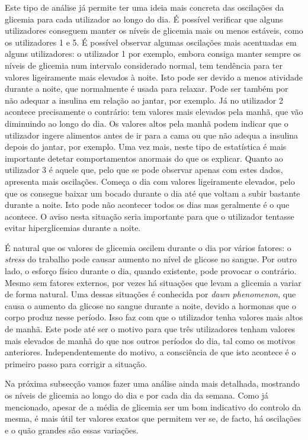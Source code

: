 Este tipo de análise já permite ter uma ideia mais concreta das oscilações da glicemia para cada utilizador ao longo do dia. É possível verificar que alguns utilizadores conseguem manter os níveis de glicemia mais ou menos estáveis, como os utilizadores 1 e 5. É possível observar algumas oscilações mais acentuadas em alguns utilizadores: o utilizador 1 por exemplo, embora consiga manter sempre os níveis de glicemia num intervalo considerado normal, tem tendência para ter valores ligeiramente mais elevados à noite. Isto pode ser devido a menos atividade durante a noite, que normalmente é usada para relaxar. Pode ser também por não adequar a insulina em relação ao jantar, por exemplo. Já no utilizador 2 acontece precisamente o contrário: tem valores mais elevados pela manhã, que vão diminuindo ao longo do dia. Os valores altos pela manhã podem indicar que o utilizador ingere alimentos antes de ir para a cama ou que não adequa a insulina depois do jantar, por exemplo. Uma vez mais, neste tipo de estatística é mais importante detetar comportamentos anormais do que os explicar. 
Quanto ao utilizador 3 é aquele que, pelo que se pode observar apenas com estes dados, apresenta mais oscilações. Começa o dia com valores ligeiramente elevados, pelo que os consegue baixar um bocado durante o dia até que voltam a subir bastante durante a noite. Isto pode não acontecer todos os dias mas geralmente é o que acontece. O aviso nesta situação seria importante para que o utilizador tentasse evitar hiperglicemias durante a noite.

É natural que os valores de glicemia oscilem durante o dia por vários fatores: o \textit{stress} do trabalho pode causar aumento no nível de glicose no sangue. Por outro lado, o esforço físico durante o dia, quando existente, pode provocar o contrário. Mesmo sem fatores externos, por vezes há situações que levam a glicemia a variar de forma natural. Uma dessas situações é conhecida por \textit{dawn phenomenon}, que causa o aumento da glicose no sangue durante a noite, devido a hormonas que o corpo produz nesse período. Isso faz com que o utilizador tenha valores mais altos de manhã. Este pode até ser o motivo para que três utilizadores tenham valores mais elevados de manhã do que nos outros períodos do dia, tal como os motivos anteriores. Independentemente do motivo, a consciência de que isto acontece é o primeiro passo para corrigir a situação.\newline



Na próxima subsecção vamos fazer uma análise ainda mais detalhada, mostrando os níveis de glicemia ao longo do dia e por cada dia da semana. Como já mencionado, apesar de a média de glicemia ser um bom indicativo do controlo da mesma, é mais útil ter valores exatos que permitem ver se, de facto, há oscilações e o quão grandes são essas variações.

